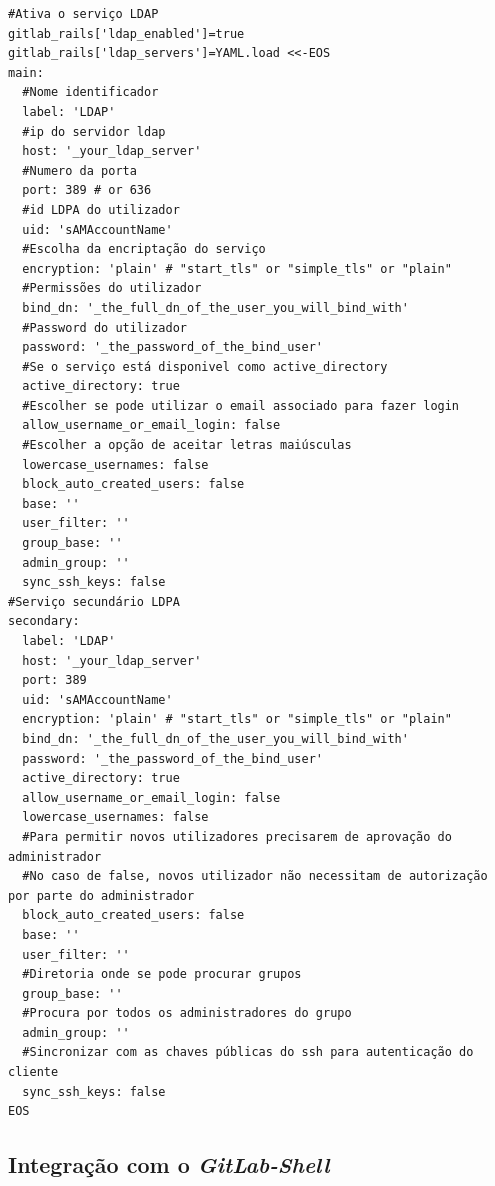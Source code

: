 \documentclass[12pt,a4paper]{article}
\begin{document}
\begin{verbatim}
#Ativa o serviço LDAP
gitlab_rails['ldap_enabled']=true
gitlab_rails['ldap_servers']=YAML.load <<-EOS
main:
  #Nome identificador
  label: 'LDAP'
  #ip do servidor ldap
  host: '_your_ldap_server'
  #Numero da porta
  port: 389 # or 636
  #id LDPA do utilizador
  uid: 'sAMAccountName'
  #Escolha da encriptação do serviço
  encryption: 'plain' # "start_tls" or "simple_tls" or "plain"
  #Permissões do utilizador
  bind_dn: '_the_full_dn_of_the_user_you_will_bind_with'
  #Password do utilizador
  password: '_the_password_of_the_bind_user'
  #Se o serviço está disponivel como active_directory
  active_directory: true
  #Escolher se pode utilizar o email associado para fazer login
  allow_username_or_email_login: false
  #Escolher a opção de aceitar letras maiúsculas
  lowercase_usernames: false
  block_auto_created_users: false
  base: ''
  user_filter: ''
  group_base: ''
  admin_group: ''
  sync_ssh_keys: false
#Serviço secundário LDPA
secondary: 
  label: 'LDAP'
  host: '_your_ldap_server'
  port: 389
  uid: 'sAMAccountName'
  encryption: 'plain' # "start_tls" or "simple_tls" or "plain"
  bind_dn: '_the_full_dn_of_the_user_you_will_bind_with'
  password: '_the_password_of_the_bind_user'
  active_directory: true
  allow_username_or_email_login: false
  lowercase_usernames: false
  #Para permitir novos utilizadores precisarem de aprovação do administrador 
  #No caso de false, novos utilizador não necessitam de autorização por parte do administrador
  block_auto_created_users: false
  base: ''
  user_filter: ''
  #Diretoria onde se pode procurar grupos
  group_base: ''
  #Procura por todos os administradores do grupo
  admin_group: ''
  #Sincronizar com as chaves públicas do ssh para autenticação do cliente
  sync_ssh_keys: false
EOS
\end{verbatim}
\fi

\subsection{Integração com o \emph{GitLab-Shell}}
\end{document}
